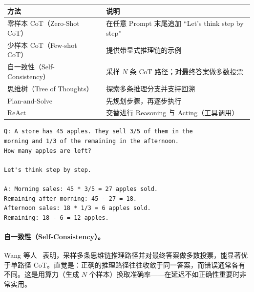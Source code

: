 \begin{keybox}[思维链的变体]
\small
\noindent\begin{tabularx}{\linewidth}{@{}Z{0.83} Z{1.17}@{}}
\toprule
\textbf{方法} & \textbf{说明} \\
\midrule
零样本 CoT（Zero-Shot CoT）~\cite{kojima2022large} & 在任意 Prompt 末尾追加 ``Let's think step by step'' \\
少样本 CoT（Few-shot CoT）~\cite{wei2022chain} & 提供带显式推理链的示例 \\
自一致性（Self-Consistency）~\cite{wang2023selfconsistency} & 采样 $N$ 条 CoT 路径；对最终答案做多数投票 \\
思维树（Tree of Thoughts）~\cite{yao2023tree} & 探索多条推理分支并支持回溯 \\
Plan-and-Solve~\cite{wang2023planandsolve} & 先规划步骤，再逐步执行 \\
ReAct~\cite{yao2023react} & 交替进行 Reasoning 与 Acting（工具调用） \\
\bottomrule
\end{tabularx}
\end{keybox}

\begin{examplebox}[零样本思维链]
\begin{lstlisting}
Q: A store has 45 apples. They sell 3/5 of them in the
morning and 1/3 of the remaining in the afternoon.
How many apples are left?

Let's think step by step.

A: Morning sales: 45 * 3/5 = 27 apples sold.
Remaining after morning: 45 - 27 = 18.
Afternoon sales: 18 * 1/3 = 6 apples sold.
Remaining: 18 - 6 = 12 apples.
\end{lstlisting}
\end{examplebox}

\paragraph{自一致性（Self-Consistency）。}
\label{self-consistency.}

Wang 等人~\cite{wang2023selfconsistency} 表明，采样多条思维链推理路径并对最终答案做多数投票，能显著优于单路径 CoT。直觉是：正确的推理路径往往收敛于同一答案，而错误通常各有不同。这是用算力（生成 $N$ 个样本）换取准确率——在延迟不如正确性重要时非常实用。

